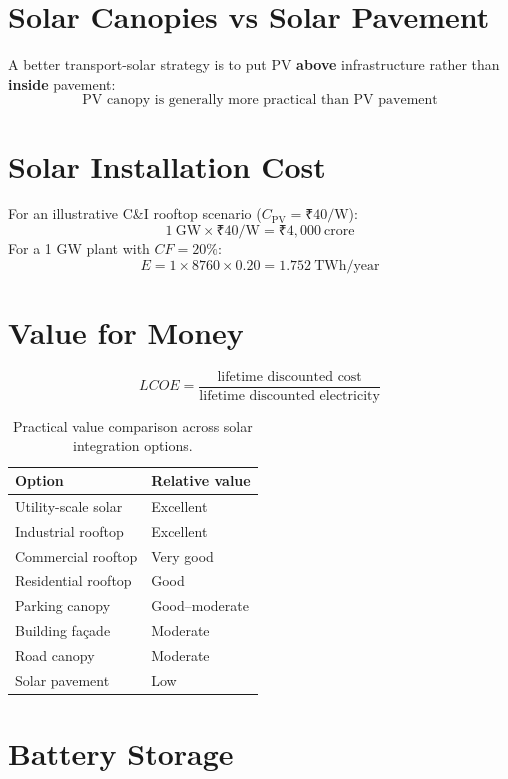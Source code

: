 \documentclass[11pt,a4paper]{article}
\begin{document}
\section{Solar Canopies vs Solar Pavement}

A better transport-solar strategy is to put PV \textbf{above} infrastructure rather than \textbf{inside} pavement:
\[
\boxed{\text{PV canopy is generally more practical than PV pavement}}
\]

\section{Solar Installation Cost}

For an illustrative C\&I rooftop scenario ($C_{\text{PV}} = \text{₹}40/\text{W}$):
\[
1\ \text{GW} \times \text{₹}40/\text{W} = \boxed{\text{₹}4,000\ \text{crore}}
\]
For a 1 GW plant with $CF = 20\%$:
\[
E = 1 \times 8760 \times 0.20 = \boxed{1.752\ \text{TWh/year}}
\]

\section{Value for Money}

\[
LCOE = \frac{\text{lifetime discounted cost}}{\text{lifetime discounted electricity}}
\]

\begin{table}[h!]
\centering
\begin{tabular}{ll}
\toprule
\textbf{Option} & \textbf{Relative value} \\
\midrule
Utility-scale solar & Excellent \\
Industrial rooftop  & Excellent \\
Commercial rooftop  & Very good \\
Residential rooftop & Good \\
Parking canopy      & Good–moderate \\
Building façade     & Moderate \\
Road canopy         & Moderate \\
Solar pavement      & Low \\
\bottomrule
\end{tabular}
\caption{Practical value comparison across solar integration options.}
\end{table}

\section{Battery Storage}
\end{document}
